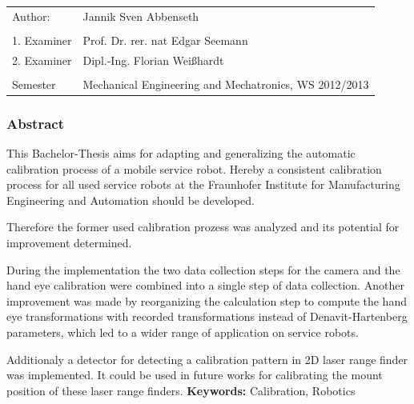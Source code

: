 \begin{tabular}{ll}

  Author:&Jannik Sven Abbenseth\\\\
  1. Examiner&Prof. Dr. rer. nat Edgar Seemann\\
  2. Examiner&Dipl.-Ing. Florian Weißhardt \\\\
  Semester& Mechanical Engineering and Mechatronics, WS 2012/2013
\end{tabular}
\subsubsection{Abstract}
\label{ssub:abstract}

This Bachelor-Thesis aims for adapting and generalizing the automatic 
calibration process of a mobile service robot.
Hereby a consistent calibration process for all used service robots at the
Fraunhofer Institute for Manufacturing Engineering and Automation should be
developed.

Therefore the former used calibration prozess was analyzed and its potential for
improvement determined.

During the implementation the two data collection steps for the camera and the
hand eye calibration were combined into a single step of data collection.
Another improvement was made by reorganizing the calculation step to compute 
the hand eye transformations with recorded transformations instead of Denavit-Hartenberg
parameters, which led to a wider range of application on service robots.

Additionaly a detector for detecting a calibration pattern in 2D laser range finder
was implemented. It could be used in future works for calibrating the mount position
of these laser range finders.
\vfill
\textbf{Keywords: }Calibration, Robotics



\tableofcontents

\listoffigures



%
%
